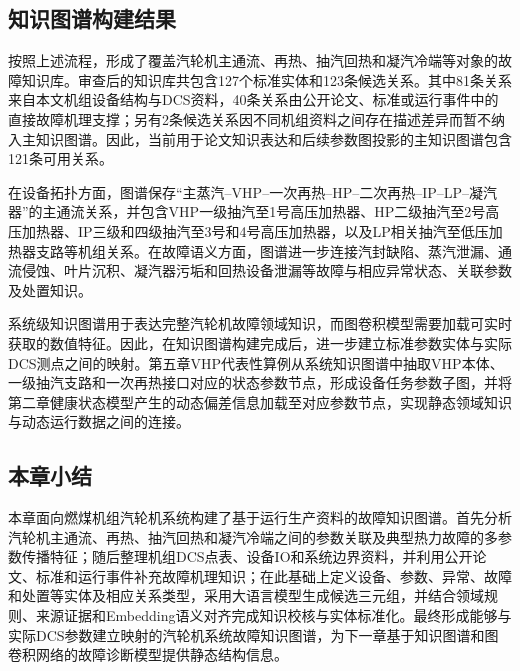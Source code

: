 \subsection{知识图谱构建结果}
\label{subsec:kg_result_v7}

按照上述流程，形成了覆盖汽轮机主通流、再热、抽汽回热和凝汽冷端等对象的故障知识库。审查后的知识库共包含127个标准实体和123条候选关系。其中81条关系来自本文机组设备结构与DCS资料，40条关系由公开论文、标准或运行事件中的直接故障机理支撑；另有2条候选关系因不同机组资料之间存在描述差异而暂不纳入主知识图谱。因此，当前用于论文知识表达和后续参数图投影的主知识图谱包含121条可用关系。

在设备拓扑方面，图谱保存“主蒸汽--VHP--一次再热--HP--二次再热--IP--LP--凝汽器”的主通流关系，并包含VHP一级抽汽至1号高压加热器、HP二级抽汽至2号高压加热器、IP三级和四级抽汽至3号和4号高压加热器，以及LP相关抽汽至低压加热器支路等机组关系。在故障语义方面，图谱进一步连接汽封缺陷、蒸汽泄漏、通流侵蚀、叶片沉积、凝汽器污垢和回热设备泄漏等故障与相应异常状态、关联参数及处置知识。

系统级知识图谱用于表达完整汽轮机故障领域知识，而图卷积模型需要加载可实时获取的数值特征。因此，在知识图谱构建完成后，进一步建立标准参数实体与实际DCS测点之间的映射。第五章VHP代表性算例从系统知识图谱中抽取VHP本体、一级抽汽支路和一次再热接口对应的状态参数节点，形成设备任务参数子图，并将第二章健康状态模型产生的动态偏差信息加载至对应参数节点，实现静态领域知识与动态运行数据之间的连接。

\subsection{本章小结}

本章面向燃煤机组汽轮机系统构建了基于运行生产资料的故障知识图谱。首先分析汽轮机主通流、再热、抽汽回热和凝汽冷端之间的参数关联及典型热力故障的多参数传播特征；随后整理机组DCS点表、设备IO和系统边界资料，并利用公开论文、标准和运行事件补充故障机理知识；在此基础上定义设备、参数、异常、故障和处置等实体及相应关系类型，采用大语言模型生成候选三元组，并结合领域规则、来源证据和Embedding语义对齐完成知识校核与实体标准化。最终形成能够与实际DCS参数建立映射的汽轮机系统故障知识图谱，为下一章基于知识图谱和图卷积网络的故障诊断模型提供静态结构信息。